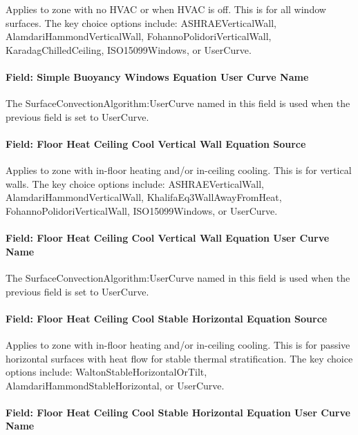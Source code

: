 Applies to zone with no HVAC or when HVAC is off. This is for all window surfaces. The key choice options include: ASHRAEVerticalWall, AlamdariHammondVerticalWall, FohannoPolidoriVerticalWall, KaradagChilledCeiling, ISO15099Windows, or UserCurve.

\paragraph{Field: Simple Buoyancy Windows Equation User Curve Name}\label{field-simple-buoyancy-windows-equation-user-curve-name}

The SurfaceConvectionAlgorithm:UserCurve named in this field is used when the previous field is set to UserCurve.

\paragraph{Field: Floor Heat Ceiling Cool Vertical Wall Equation Source}\label{field-floor-heat-ceiling-cool-vertical-wall-equation-source}

Applies to zone with in-floor heating and/or in-ceiling cooling. This is for vertical walls. The key choice options include: ASHRAEVerticalWall, AlamdariHammondVerticalWall, KhalifaEq3WallAwayFromHeat, FohannoPolidoriVerticalWall, ISO15099Windows, or UserCurve.

\paragraph{Field: Floor Heat Ceiling Cool Vertical Wall Equation User Curve Name}\label{field-floor-heat-ceiling-cool-vertical-wall-equation-user-curve-name}

The SurfaceConvectionAlgorithm:UserCurve named in this field is used when the previous field is set to UserCurve.

\paragraph{Field: Floor Heat Ceiling Cool Stable Horizontal Equation Source}\label{field-floor-heat-ceiling-cool-stable-horizontal-equation-source}

Applies to zone with in-floor heating and/or in-ceiling cooling. This is for passive horizontal surfaces with heat flow for stable thermal stratification. The key choice options include: WaltonStableHorizontalOrTilt, AlamdariHammondStableHorizontal, or UserCurve.

\paragraph{Field: Floor Heat Ceiling Cool Stable Horizontal Equation User Curve Name}\label{field-floor-heat-ceiling-cool-stable-horizontal-equation-user-curve-name}

